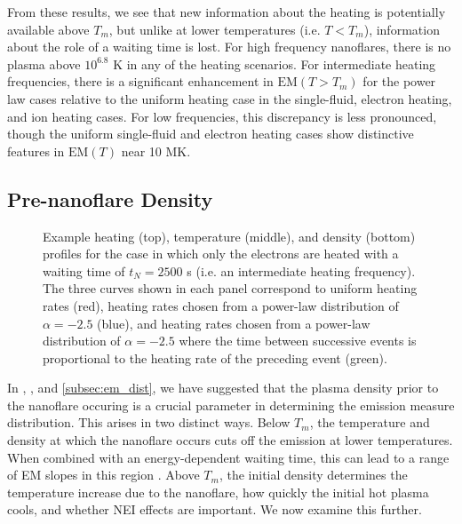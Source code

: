\documentclass[preprint]{aastex}
\begin{document}
	\par From these results, we see that new information about the heating is potentially available above $T_m$, but unlike at lower temperatures (i.e. $T<T_m$), information about the role of a waiting time is lost. For high frequency nanoflares, there is no plasma above $10^{6.8}$ K in any of the heating scenarios. For intermediate heating frequencies, there is a significant enhancement in $\mathrm{EM}(T>T_m)$ for the power law cases relative to the uniform heating case in the single-fluid, electron heating, and ion heating cases. For low frequencies, this discrepancy is less pronounced, though the uniform single-fluid and electron heating cases show distinctive features in $\mathrm{EM}(T)$ near 10 MK.
	\subsection{Pre-nanoflare Density}
	\label{subsec:pre_nanoflare_density}
	\begin{figure*}
		\caption{Example heating (top), temperature (middle), and density (bottom) profiles for the case in which only the electrons are heated with a waiting time of $t_N=2500$ s (i.e. an intermediate heating frequency). The three curves shown in each panel correspond to uniform heating rates (red), heating rates chosen from a power-law distribution of $\alpha=-2.5$ (blue), and heating rates chosen from a power-law distribution of $\alpha=-2.5$ where the time between successive events is proportional to the heating rate of the preceding event (green).}
		\label{fig:nT_sample_profiles}
	\end{figure*}
	\par In \citet{cargill_active_2014}, , and \autoref{subsec:em_dist}, we have suggested that the plasma density prior to the nanoflare occuring is a crucial parameter in determining the emission measure distribution. This arises in two distinct ways. Below $T_m$, the temperature and density at which the nanoflare occurs cuts off the emission at lower temperatures. When combined with an energy-dependent waiting time, this can lead to a range of EM slopes in this region \citep{cargill_active_2014}. Above $T_m$, the initial density determines the temperature increase due to the nanoflare, how quickly the initial hot plasma cools, and whether NEI effects are important. We now examine this further.
\end{document}
